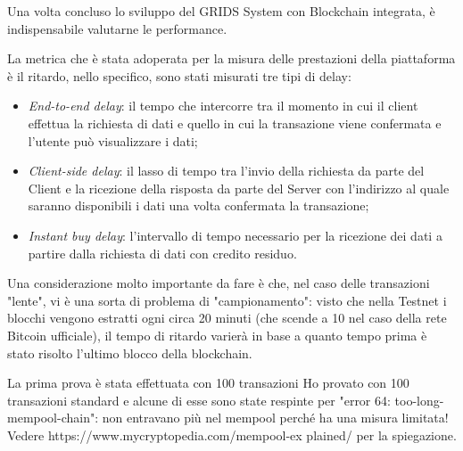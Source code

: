 Una volta concluso lo sviluppo del GRIDS System con Blockchain integrata, è indispensabile valutarne le performance.

La metrica che è stata adoperata per la misura delle prestazioni della piattaforma è il ritardo, nello specifico, sono stati misurati tre tipi di delay:

\begin{itemize}
    \item \textit{End-to-end delay}: il tempo che intercorre tra il momento in cui il client effettua la richiesta di dati e quello in cui la transazione viene confermata e l'utente può visualizzare i dati;
    \item \textit{Client-side delay}: il lasso di tempo tra l'invio della richiesta da parte del Client e la ricezione della risposta da parte del Server con l'indirizzo al quale saranno disponibili i dati una volta confermata la transazione;
    \item \textit{Instant buy delay}: l'intervallo di tempo necessario per la ricezione dei dati a partire dalla richiesta di dati con credito residuo.
\end{itemize}

Una considerazione molto importante da fare è che, nel caso delle transazioni "lente", vi è una sorta di problema di "campionamento": visto che nella Testnet i blocchi vengono estratti ogni circa 20 minuti (che scende a 10 nel caso della rete Bitcoin ufficiale), il tempo di ritardo varierà in base a quanto tempo prima è stato risolto l'ultimo blocco della blockchain.

La prima prova è stata effettuata con 100 transazioni  
Ho provato con 100 transazioni standard e alcune di esse sono state respinte per "error 64: too-long-mempool-chain": non entravano più nel mempool perché ha una misura limitata! Vedere https://www.mycryptopedia.com/mempool-ex plained/ per la spiegazione.

